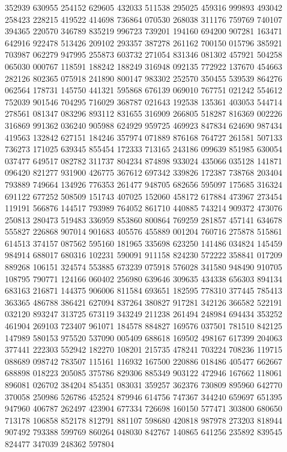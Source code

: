{352939 630955 254152 629605 432033 511538 295025 459316 999893 493042 258423%
228215 419522 414698 736864 070530 268038 311176 759769 740107 394365 220570%
346789 835219 996723 739201 194160 694200 907281 163471 642916 922478 513426%
209102 293357 387278 261162 700150 015796 385921 703987 062279 947995 255873%
603732 271054 831346 081302 457921 504258 065030 000767 118591 188242 188249%
316948 092135 772922 137670 454663 282126 802365 075918 241890 800147 983302%
252570 350455 539539 864276 062564 178731 145750 441321 595868 676139 069010%
767751 021242 554612 752039 901546 704295 716029 368787 021643 192538 135361%
403053 544714 278561 081347 083296 893112 831655 316909 266805 518287 816369%
002226 316869 991362 036240 905988 624929 959725 469923 847834 624690 987434%
419563 132842 627151 184246 357974 071889 876168 764727 261581 507133 736273%
171025 639345 855454 172333 713165 243186 099639 851985 630054 037477 649517%
082782 311737 804234 874898 933024 435066 035128 141871 096420 821277 931900%
426775 367612 697342 339826 172387 738768 203404 793889 749664 134926 776353%
261477 948705 682656 595097 175685 316324 691122 677252 508509 151743 407025%
152060 458172 617884 473967 273454 119191 566876 144517 793989 764052 861710%
440885 743214 909372 473076 250813 280473 519483 336959 853860 800864 769259%
281857 457141 634678 555827 226868 907014 901683 405576 455889 001204 760716%
275878 515861 614513 374157 087562 595160 181965 335698 623250 141486 034824%
145459 984914 688017 680316 102231 590091 911158 824230 572222 358841 017209%
889268 106151 324574 553885 673239 075918 576028 341580 948490 910705 108795%
790771 124166 060402 256980 639646 309635 434338 656303 894134 683163 216871%
144375 906006 811584 693651 182595 778310 377445 785413 363365 486788 386421%
627094 837264 380827 917281 342126 366582 522191 032120 893247 313725 673119%
343249 211238 261494 248984 694434 353252 461904 269103 723407 961071 184578%
884827 169576 037501 781510 842125 147989 580153 975520 537090 005409 688618%
169502 498167 617399 204063 377441 222303 552942 182270 108201 215735 478241%
703224 708236 119715 088689 098742 783507 115161 116932 167500 220886 018486%
405477 662667 688898 018223 205085 375786 829306 885349 903122 472946 167662%
118061 896081 026702 384204 854351 083031 359257 362376 730809 895960 642770%
370058 250986 526786 452524 879946 614756 747367 344240 659697 651395 947960%
406787 262497 423904 677334 726698 160150 577471 303800 680650 713178 106858%
852178 812791 881107 598680 420818 987978 273203 818944 907492 793388 599769%
860264 048030 842767 140865 641256 235892 839545 824477 347039 248362 597804%
}

